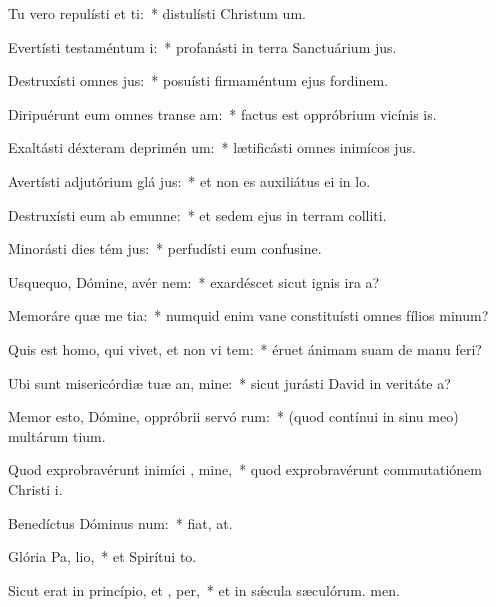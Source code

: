 \item Tu vero repulísti et ti:~* distulísti Christum um.
\item Evertísti testaméntum  i:~* profanásti in terra Sanctuárium jus.
\item Destruxísti omnes  jus:~* posuísti firmaméntum ejus fordinem.
\item Diripuérunt eum omnes transe am:~* factus est oppróbrium vicínis is.
\item Exaltásti déxteram deprimén um:~* lætificásti omnes inimícos jus.
\item Avertísti adjutórium glá jus:~* et non es auxiliátus ei in lo.
\item Destruxísti eum ab emunne:~* et sedem ejus in terram colliti.
\item Minorásti dies tém jus:~* perfudísti eum confusine.
\item Usquequo, Dómine, avér  nem:~* exardéscet sicut ignis ira a?
\item Memoráre quæ me tia:~* numquid enim vane constituísti omnes fílios minum?
\item Quis est homo, qui vivet, et non vi tem:~* éruet ánimam suam de manu feri?
\item Ubi sunt misericórdiæ tuæ an, mine:~* sicut jurásti David in veritáte a?
\item Memor esto, Dómine, oppróbrii servó rum:~* (quod contínui in sinu meo) multárum tium.
\item Quod exprobravérunt inimíci , mine,~* quod exprobravérunt commutatiónem Christi i.
\item Benedíctus Dóminus  num:~* fiat, at.
\item Glória Pa,  lio,~* et Spirítui to.
\item Sicut erat in princípio, et ,  per,~* et in sǽcula sæculórum. men.
